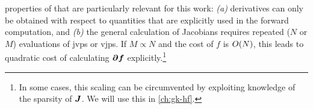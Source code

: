  properties of \ad that are particularly relevant for this work: \emph{(a)} derivatives can only be obtained with respect to quantities that are explicitly used in the forward computation, and \emph{(b)} the general calculation of Jacobians requires repeated ($N$ or $M$) evaluations of \glspl{jvp} or \glspl{vjp}. If $M \propto N$ and the cost of $f$ is $O(N)$, this leads to quadratic cost of calculating $\boldsymbol{\partial f}$ explicitly.\footnote[][-3\baselineskip]{In some cases, this scaling can be circumvented by exploiting knowledge of the sparsity of $\boldsymbol{J}$. We will use this in \cref{ch:gk-hf}.}
